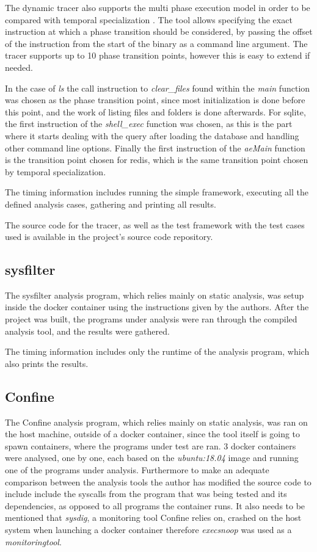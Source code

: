 The dynamic tracer also supports the multi phase execution model in order to be compared with temporal specialization \cite{ref_mp_1}. The tool allows specifying the exact instruction at which a phase transition should be considered, by passing the offset of the instruction from the start of the binary as a command line argument. The tracer supports up to 10 phase transition points, however this is easy to extend if needed.

In the case of \textit{ls} the call instruction to \textit{clear\_files} found within the \textit{main} function was chosen as the phase transition point, since most initialization is done before this point, and the work of listing files and folders is done afterwards.
For sqlite, the first instruction of the \textit{shell\_exec} function was chosen, as this is the part where it starts dealing with the query after loading the database and handling other command line options.
Finally the first instruction of the \textit{aeMain} function is the transition point chosen for redis, which is the same transition point chosen by temporal specialization.

The timing information includes running the simple framework, executing all the defined analysis cases, gathering and printing all results.

The source code for the tracer, as well as the test framework with the test cases used is available in the project's source code repository.

\subsection {sysfilter}
The sysfilter \cite{ref_sp_3} analysis program, which relies mainly on static analysis, was setup inside the docker container using the instructions given by the authors.
After the project was built, the programs under analysis were ran through the compiled analysis tool, and the results were gathered.

The timing information includes only the runtime of the analysis program, which also prints the results.

\subsection {Confine}
The Confine \cite{ref_sp_2} analysis program, which relies mainly on static analysis, was ran on the host machine, outside of a docker container, since the tool itself is going to spawn containers, where the programs under test are ran.
3 docker containers were analysed, one by one, each based on the \textit{ubuntu:18.04} image and running one of the programs under analysis.
Furthermore to make an adequate comparison between the analysis tools the author has modified the source code to include include the syscalls from the program that was being tested and its dependencies, as opposed to all programs the container runs.
It also needs to be mentioned that \textit{sysdig}, a monitoring tool Confine relies on, crashed on the host system when launching a docker container therefore \textit{execsnoop} was used as a \textit{monitoringtool}.

